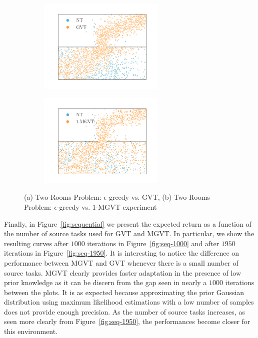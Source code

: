 \documentclass{article}
\begin{document}
\begin{figure}[t]
  \begin{subfigure}[b]{0.45\textwidth}
    \includegraphics[trim=0.5cm 0.5cm 1.5cm 1.3cm,clip=true,height=4.5cm]{images/three-room-app/nt_vs_gvt.png}
    \caption{}
    \label{fig:nt-vs-gvt}
  \end{subfigure}
  \begin{subfigure}[b]{0.45\textwidth}
    \includegraphics[trim=0.5cm 0.5cm 1.5cm 1.3cm,clip=true,height=4.5cm]{images/three-room-app/nt_vs_mgvt.png}
    \caption{}
    \label{fig:nt-vs-mgvt}
  \end{subfigure}
  \caption{(a) Two-Rooms Problem: $\epsilon$-greedy vs. GVT, (b) Two-Rooms Problem: $\epsilon$-greedy vs. 1-MGVT experiment}
  \label{fig:rooms-expl}
\end{figure}

Finally, in Figure~\ref{fig:sequential} we present the expected return as a function of the number of source tasks used for GVT and MGVT. In particular, we show the resulting curves after $1000$ iterations in Figure~\ref{fig:seq-1000} and after $1950$ iterations in Figure~\ref{fig:seq-1950}. It is interesting to notice the difference on performance between MGVT and GVT whenever there is a small number of source tasks. MGVT clearly provides faster adaptation in the presence of low prior knowledge as it can be discern from the gap seen in nearly a $1000$ iterations between the plots. It is as expected because approximating the prior Gaussian distribution using maximum likelihood estimations with a low number of samples does not provide enough precision. As the number of source tasks increases, as seen more clearly from Figure~\ref{fig:seq-1950}, the performances become closer for this environment. 
\end{document}
